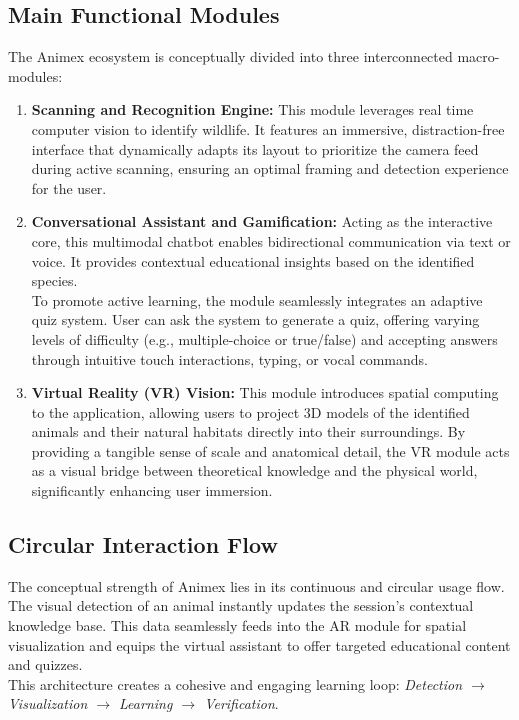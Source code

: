 \documentclass{article}
\begin{document}
\subsection{Main Functional Modules}
The Animex ecosystem is conceptually divided into three interconnected macro-modules:
\begin{enumerate}
    \item \textbf{Scanning and Recognition Engine:} This module leverages real time computer vision to identify wildlife. It features an immersive, distraction-free interface that dynamically adapts its layout to prioritize the camera feed during active scanning, ensuring an optimal framing and detection experience for the user.
    
    \item \textbf{Conversational Assistant and Gamification:} Acting as the interactive core, this multimodal chatbot enables bidirectional communication via text or voice. It provides contextual educational insights based on the identified species.\\ 
    To promote active learning, the module seamlessly integrates an adaptive quiz system. User can ask the system to generate a quiz, offering varying levels of difficulty (e.g., multiple-choice or true/false) and accepting answers through intuitive touch interactions, typing, or vocal commands.
    
    \item \textbf{Virtual Reality (VR) Vision:} This module introduces spatial computing to the application, allowing users to project 3D models of the identified animals and their natural habitats directly into their surroundings. By providing a tangible sense of scale and anatomical detail, the VR module acts as a visual bridge between theoretical knowledge and the physical world, significantly enhancing user immersion.
\end{enumerate}
\subsection{Circular Interaction Flow}
The conceptual strength of Animex lies in its continuous and circular usage flow.
The visual detection of an animal instantly updates the session's contextual knowledge base.
This data seamlessly feeds into the AR module for spatial visualization and equips the virtual assistant to offer targeted educational content and quizzes.\\ 
This architecture creates a cohesive and engaging learning loop: \textit{Detection $\rightarrow$ Visualization $\rightarrow$ Learning $\rightarrow$ Verification}.
\clearpage
\end{document}
